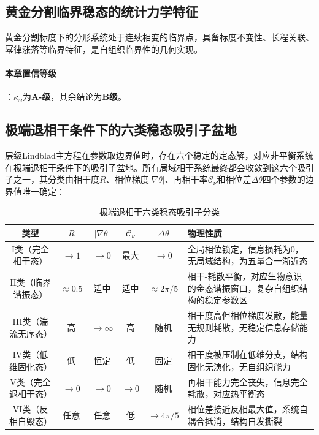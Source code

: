 \documentclass[12pt,a4paper,twocolumn]{article}
\begin{document}
\subsection{黄金分割临界稳态的统计力学特征}
黄金分割标度下的分形系统处于连续相变的临界点，具备标度不变性、长程关联、幂律涨落等临界特征，是自组织临界性的几何实现。

\paragraph{本章置信等级}：$\kappa_\omega$为\textbf{A-级}，其余结论为\textbf{B级}。


\subsection{极端退相干条件下的六类稳态吸引子盆地}
\label{subsec:six_attractors}
层级Lindblad主方程在参数取边界值时，存在六个稳定的定态解，对应非平衡系统在极端退相干条件下的吸引子盆地。所有局域相干系统最终都会收敛到这六个吸引子之一，其分类由相干度$R$、相位梯度$|\nabla\theta|$、再相干率$\mathcal{C}_\nu$和相位差$\Delta\theta$四个参数的边界值唯一确定：

\begin{table}[H]
\centering
\footnotesize
\caption{极端退相干六类稳态吸引子分类}
\begin{tabular}{c|c|c|c|c|p{3.5cm}}
\hline
\textbf{类型} & $R$ & $|\nabla\theta|$ & $\mathcal{C}_\nu$ & $\Delta\theta$ & \textbf{物理性质} \\
\hline
I类（完全相干态） & $\to1$ & $\to0$ & 最大 & $\to0$ & 全局相位锁定，信息损耗为0，无局域结构，为五量合一渐近态 \\
II类（临界谐振态） & $\approx0.5$ & 适中 & 适中 & $\approx2\pi/5$ & 相干-耗散平衡，对应生物意识的金态谐振窗口，复杂自组织结构的稳定参数区 \\
III类（湍流无序态） & 高 & $\to\infty$ & 高 & 随机 & 相干度高但相位梯度发散，能量无规则耗散，无稳定信息存储能力 \\
IV类（低维固化态） & 低 & 恒定 & 低 & 固定 & 相干度被压制在低维分支，结构固化无演化，无自组织能力 \\
V类（完全退相干态） & $\to0$ & $\to0$ & $\to0$ & 随机 & 再相干能力完全丧失，信息完全耗散，对应热平衡态 \\
VI类（反相自毁态） & 任意 & 任意 & 低 & $\to4\pi/5$ & 相位差接近反相最大值，系统自耦合抵消，结构自发撕裂 \\
\hline
\end{tabular}
\end{table}
\end{document}
